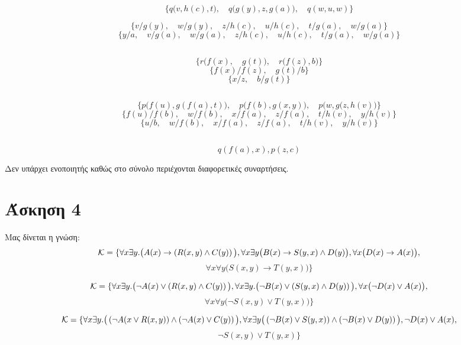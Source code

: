 \documentclass[a4paper,oneside, 11pt]{article}
\newcommand*{\im}{\ensuremath{\to}}
\newcommand*{\ex}{\ensuremath{\exists}}
\newcommand*{\f}{\ensuremath{\forall}}
\newcommand*{\p}{\ensuremath{\left(}}
\newcommand*{\pp}{\ensuremath{\right)}}
\newcommand*{\ww}{\ensuremath{\wedge}}
\newcommand*{\vv}{\ensuremath{\vee}}
\begin{document}
\subsection{}
$$\{ q\big(v, h(c), t\big), \quad q\big(g(y), z, g(a) \big), \quad q(w, u, w)\}$$

$$
\{v/g(y), \quad w/g(y), \quad z/h(c), \quad u/h(c), \quad t/g(a), \quad w/g(a)\}   
$$
$$
\boxed { \{ y/a, \quad v/g(a), \quad w/g(a), \quad z/h(c), \quad u/h(c), \quad t/g(a), \quad w/g(a) \} }
$$


\subsection{}
$$
\{ r\big(f(x), \quad g(t)\big), \quad r\big(f(z), b\big)\}
$$
$$
\{ f(x)/f(z), \quad g(t)/b \}
$$
$$
\boxed{ \{ x/z, \quad b/g(t)\}}
$$

\subsection{}
$$
\{ p\big( f(u), g(f(a), t) \big), \quad p\big( f(b), g(x,y) \big), \quad p\big(w, g(z, h(v) \big)\}
$$
$$
\{ f(u)/f(b), \quad w/f(b), \quad x/f(a), \quad z/f(a), \quad t/h(v), \quad y/h(v)\}
$$
$$
\boxed{ \{ u/b, \quad w/f(b), \quad x/f(a), \quad z/f(a), \quad t/h(v), \quad y/h(v)\}}
$$

\subsection{}
$$q(f(a), x), p(z,c)$$



Δεν υπάρχει ενοποιητής καθώς στο σύνολο περιέχονται διαφορετικές συναρτήσεις.


\section{Άσκηση 4}

Μας δίνεται η γνώση:
$$
\mathcal{K} = \{ \f x \ex y. \big( A(x) \im \p R(x,y) \ww C(y) \pp \big),  \f x \ex y \big( B(x) \im S(y,x) \ww D(y) \big), \f x \big( D(x) \im A(x) \big ), 
$$
$$
\f x \f y \big( S(x,y) \im T(y,x) \big) \}
$$

$$
\mathcal{K} = \{ \f x \ex y. \big( \neg A(x) \vv \p R(x,y) \ww C(y) \pp \big), \f x \ex y. \big( \neg B(x) \vv \p S(y,x) \ww D(y) \pp \big), \f x \big ( \neg D(x) \vv A(x) \big), 
$$
$$
\f x \f y \big( \neg S(x,y) \vv T(y,x) \big)
\}
$$

$$
\mathcal{K} = \{ \f x \ex y. \big( \p \neg A(x \vv R(x,y)\pp \ww \p \neg A(x) \vv C(y) \pp \big), \f x \ex y \big( \p \neg B(x) \vv S(y,x) \pp \ww \p \neg B(x) \vv D(y) \pp \big), \neg D(x) \vv A(x),
$$
$$
\neg S(x,y) \vv T(y,x)
\}
$$
\end{document}

